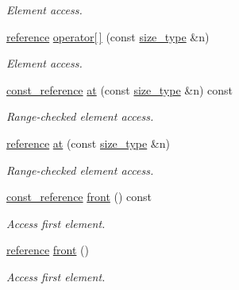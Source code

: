 \begin{DoxyCompactItemize}
\begin{DoxyCompactList}\small\item\em Element access. \end{DoxyCompactList}\item 
\hyperlink{classIceBRG_1_1labeled__array__vecs_a83e2aad33d65d344a7df84aab091e48d}{reference} \hyperlink{classIceBRG_1_1labeled__array__vecs_a8d38425a36c60808674fbd8db59d868b}{operator\mbox{[}$\,$\mbox{]}} (const \hyperlink{classIceBRG_1_1labeled__array__vecs_a9395382460f12145dc0c835e78283fdd}{size\+\_\+type} \&n)
\begin{DoxyCompactList}\small\item\em Element access. \end{DoxyCompactList}\item 
\hyperlink{classIceBRG_1_1labeled__array__vecs_a5ab1d23d61a03d4f64756b59f5773d41}{const\+\_\+reference} \hyperlink{classIceBRG_1_1labeled__array__vecs_a8178a1581f73ac8686c551280d0bda44}{at} (const \hyperlink{classIceBRG_1_1labeled__array__vecs_a9395382460f12145dc0c835e78283fdd}{size\+\_\+type} \&n) const 
\begin{DoxyCompactList}\small\item\em Range-\/checked element access. \end{DoxyCompactList}\item 
\hyperlink{classIceBRG_1_1labeled__array__vecs_a83e2aad33d65d344a7df84aab091e48d}{reference} \hyperlink{classIceBRG_1_1labeled__array__vecs_afa6747759c1fdb4dba4d7636d6a30eac}{at} (const \hyperlink{classIceBRG_1_1labeled__array__vecs_a9395382460f12145dc0c835e78283fdd}{size\+\_\+type} \&n)
\begin{DoxyCompactList}\small\item\em Range-\/checked element access. \end{DoxyCompactList}\item 
\hyperlink{classIceBRG_1_1labeled__array__vecs_a5ab1d23d61a03d4f64756b59f5773d41}{const\+\_\+reference} \hyperlink{classIceBRG_1_1labeled__array__vecs_a9356083abfd390c7a04d7dfd4796c85f}{front} () const 
\begin{DoxyCompactList}\small\item\em Access first element. \end{DoxyCompactList}\item 
\hyperlink{classIceBRG_1_1labeled__array__vecs_a83e2aad33d65d344a7df84aab091e48d}{reference} \hyperlink{classIceBRG_1_1labeled__array__vecs_acdd9797396e19001756b9d2f48adb72b}{front} ()
\begin{DoxyCompactList}\small\item\em Access first element. \end{DoxyCompactList}\item 

\end{DoxyCompactItemize}
